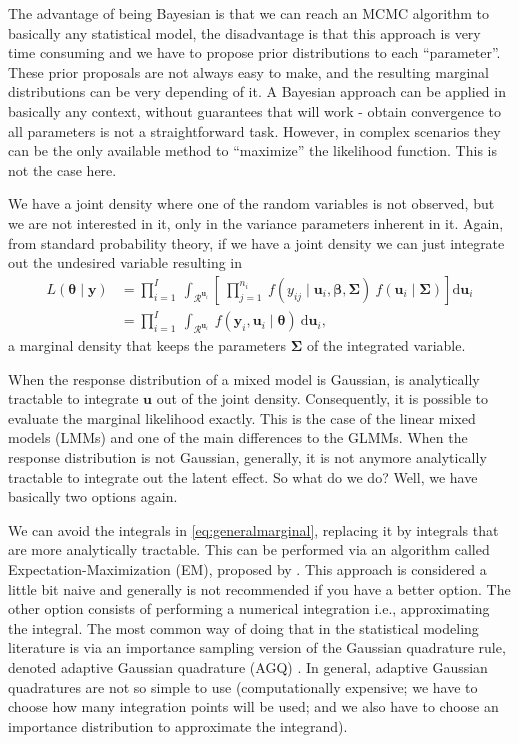 The advantage of being Bayesian is that we can reach an MCMC algorithm
to basically any statistical model, the disadvantage is that this
approach is very time consuming and we have to propose prior
distributions to each ``parameter''. These prior proposals are not
always easy to make, and the resulting marginal distributions can be
very depending of it. A Bayesian approach can be applied in basically
any context, without guarantees that will work - obtain convergence to
all parameters is not a straightforward task. However, in complex
scenarios they can be the only available method to ``maximize'' the
likelihood function. This is not the case here.

We have a joint density where one of the random variables is not
observed, but we are not interested in it, only in the variance
parameters inherent in it. Again, from standard probability theory, if
we have a joint density we can just integrate out the undesired variable
resulting in
\begin{equation}
 \begin{aligned}
  L(\bm{\theta} \mid \bm{y}) &=
  \prod_{i=1}^{I}~\int_{\mathcal{R}^{\bm{u}_{i}}}
  \left[~\prod_{j=1}^{n_{i}}~
         f(y_{ij} \mid \bm{u}_{i}, \bm{\beta,\Sigma})~
         f(\bm{u}_{i} \mid \bm{\Sigma})
  \right]\text{d} \bm{u}_{i}\\
  &= \prod_{i=1}^{I}~\int_{\mathcal{R}^{\bm{u}_{i}}}~
  f(\bm{y}_{i}, \bm{u}_{i} \mid \bm{\theta})~\text{d} \bm{u}_{i},
  \label{eq:generalmarginal}
 \end{aligned}
\end{equation}
a marginal density that keeps the parameters \(\bm{\Sigma}\) of the
integrated variable.

When the response distribution of a mixed model is Gaussian, is
analytically tractable to integrate \(\bm{u}\) out of the joint density.
Consequently, it is possible to evaluate the marginal likelihood
exactly. This is the case of the linear mixed models (LMMs) and one of
the main differences to the GLMMs. When the response distribution is not
Gaussian, generally, it is not anymore analytically tractable to
integrate out the latent effect. So what do we do? Well, we have
basically two options again.

We can avoid the integrals in \autoref{eq:generalmarginal}, replacing it
by integrals that are more analytically tractable. This can be performed
via an algorithm called Expectation-Maximization (EM), proposed by
. This approach is considered a little bit naive and
generally is not recommended if you have a better option. The other
option consists of performing a numerical integration i.e.,
approximating the integral. The most common way of doing that in the
statistical modeling literature is via an importance sampling version of
the Gaussian quadrature rule, denoted adaptive Gaussian quadrature (AGQ)
\cite{quadrature}. In general, adaptive Gaussian quadratures are not so
simple to use (computationally expensive; we have to choose how many
integration points will be used; and we also have to choose an
importance distribution to approximate the integrand).

